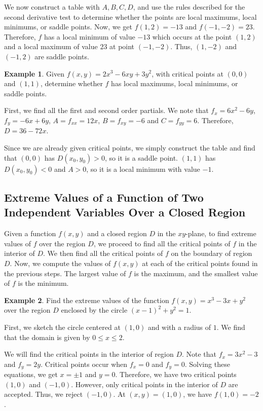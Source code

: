 \documentclass[11pt]{article}
\theoremstyle{plain} %
\theoremstyle{definition}
\theoremstyle{example}
\newtheorem*{example}{Example}
\theoremstyle{remark}
\begin{document}
We now construct a table with $A, B, C, D$, and use the rules described for the second derivative test to determine whether the points are local maximums, local minimums, or saddle points. Now, we get $f(1, 2) = -13$ and $f(-1, -2) = 23 $. Therefore, $f$ has a local minimum of value $-13$ which occurs at the point $(1, 2)$ and a local maximum of value $23$ at point $(-1, -2)$. Thus, $(1, -2)$ and $(-1, 2)$ are saddle points.


\begin{example}
Given $f(x,y) = 2x^3-6xy+3y^2$, with critical points at $(0,0)$ and $(1,1)$, determine whether $f$ has local maximums, local minimums, or saddle points.
\end{example}

First, we find all the first and second order partials. We note that $f_x=6x^2-6y$, $f_y = -6x+6y$, $A = f_{xx} = 12x$, $B = f_{xy} = -6$ and $C = f_{yy} = 6$. Therefore, $D= 36-72x$.

Since we are already given critical points, we simply construct the table and find that $(0,0)$ has $D(x_0, y_0)>0$, so it is a saddle point. $(1,1)$ has $D(x_0, y_0)<0$ and $A>0$, so it is a local minimum with value $-1$.

\subsection{Extreme Values of a Function of Two Independent Variables Over a Closed Region}

Given a function $f(x,y)$ and a closed region $D$ in the $xy$-plane, to find extreme values of $f$ over the region $D$, we proceed to find all the critical points of $f$ in the interior of $D$. We then find all the critical points of $f$ on the boundary of region $D$. Now, we compute the values of $f(x,y)$ at each of the critical points found in the previous steps. The largest value of $f$ is the maximum, and the smallest value of $f$ is the minimum. 

\begin{example}
Find the extreme values of the function $f(x,y) = x^3 -3x+y^2$ over the region $D$ enclosed by the circle $(x-1)^2+y^2 = 1$. 
\end{example}

First, we sketch the circle centered at $(1,0)$ and with a radius of $1$. We find that the domain is given by $0 \leq x \leq 2$. 

We will find the critical points in the interior of region $D$. Note that $f_x=3x^2-3$ and $f_y = 2y$. Critical points occur when $f_x=0$ and $f_y=0$. Solving these equations, we get $x= \pm 1$ and $y=0$. Therefore, we have two critical points $(1,0)$ and $(-1,0)$. However, only critical points in the interior of $D$ are accepted. Thus, we reject $(-1, 0)$. At $(x,y) = (1,0)$, we have $f(1,0) = -2$. 
\end{document}
